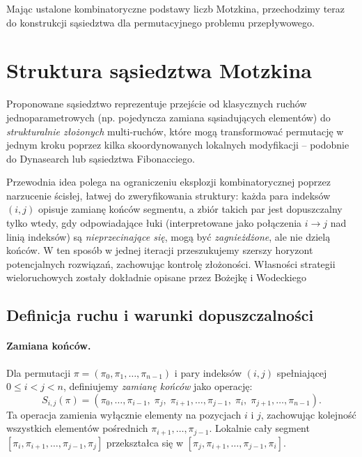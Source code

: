 \medskip
Mając ustalone kombinatoryczne podstawy liczb Motzkina, przechodzimy teraz do konstrukcji sąsiedztwa dla permutacyjnego problemu przepływowego.


\section{Struktura sąsiedztwa Motzkina}

Proponowane sąsiedztwo reprezentuje przejście od klasycznych ruchów jednoparametrowych (np. pojedyncza zamiana sąsiadujących elementów) do \emph{strukturalnie złożonych} multi-ruchów, które mogą transformować permutację w jednym kroku poprzez kilka skoordynowanych lokalnych modyfikacji -- podobnie do Dynasearch lub sąsiedztwa Fibonacciego\cite{Fibona}.

Przewodnia idea polega na ograniczeniu eksplozji kombinatorycznej poprzez narzucenie ścisłej, łatwej do zweryfikowania struktury: każda para indeksów $(i,j)$ opisuje zamianę końców segmentu, a zbiór takich par jest dopuszczalny tylko wtedy, gdy odpowiadające łuki (interpretowane jako połączenia $i \to j$ nad linią indeksów) są \emph{nieprzecinające się}, mogą być \emph{zagnieżdżone}, ale nie dzielą końców. W ten sposób w jednej iteracji przeszukujemy szerszy horyzont potencjalnych rozwiązań, zachowując kontrolę złożoności. Własności strategii wieloruchowych zostały dokładnie opisane przez Bożejkę i Wodeckiego \cite{Bozejko2007}

\subsection{Definicja ruchu i warunki dopuszczalności}
\paragraph{Zamiana końców.}
Dla permutacji $\pi = (\pi_0,\pi_1,\ldots,\pi_{n-1})$ i pary indeksów $(i,j)$ spełniającej $0 \le i < j < n$, definiujemy \emph{zamianę końców} jako operację:
\begin{equation}\label{eq_S_ji}
S_{i,j}(\pi) = (\pi_0,\ldots,\pi_{i-1},\; \pi_j,\; \pi_{i+1},\ldots,\pi_{j-1},\; \pi_i,\; \pi_{j+1},\ldots,\pi_{n-1}).
\end{equation}
Ta operacja zamienia wyłącznie elementy na pozycjach $i$ i $j$, zachowując kolejność wszystkich elementów pośrednich $\pi_{i+1},\ldots,\pi_{j-1}$. Lokalnie cały segment $[\pi_i,\pi_{i+1},\ldots,\pi_{j-1},\pi_j]$ przekształca się w $[\pi_j,\pi_{i+1},\ldots,\pi_{j-1},\pi_i]$.

